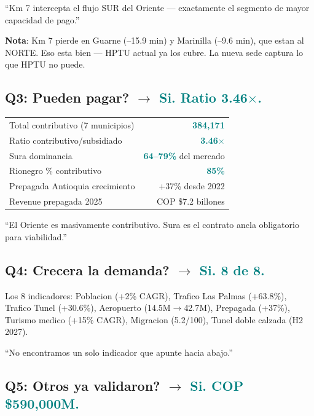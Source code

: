 \documentclass[11pt, a4paper]{article}
\newcommand{\hl}[1]{\textcolor{teal}{\textbf{#1}}}
\begin{document}
\begin{cita}
``Km 7 intercepta el flujo SUR del Oriente --- exactamente el segmento de mayor capacidad de pago.''
\end{cita}

\begin{tip}
\textbf{Nota}: Km 7 pierde en Guarne (--15.9 min) y Marinilla (--9.6 min), que estan al NORTE. Eso esta bien --- HPTU actual ya los cubre. La nueva sede captura lo que HPTU no puede.
\end{tip}

\subsection{Q3: Pueden pagar? $\to$ \hl{Si. Ratio 3.46$\times$.}}

\begin{tabular}{@{}l r@{}}
\toprule
Total contributivo (7 municipios) & \hl{384,171} \\
Ratio contributivo/subsidiado & \hl{3.46$\times$} \\
Sura dominancia & \hl{64--79\%} del mercado \\
Rionegro \% contributivo & \hl{85\%} \\
Prepagada Antioquia crecimiento & +37\% desde 2022 \\
Revenue prepagada 2025 & COP \$7.2 billones \\
\bottomrule
\end{tabular}

\begin{cita}
``El Oriente es masivamente contributivo. Sura es el contrato ancla obligatorio para viabilidad.''
\end{cita}

\subsection{Q4: Crecera la demanda? $\to$ \hl{Si. 8 de 8.}}

Los 8 indicadores: Poblacion (+2\% CAGR), Trafico Las Palmas (+63.8\%), Trafico Tunel (+30.6\%), Aeropuerto (14.5M$\to$42.7M), Prepagada (+37\%), Turismo medico (+15\% CAGR), Migracion (5.2/100), Tunel doble calzada (H2 2027).

\begin{cita}
``No encontramos un solo indicador que apunte hacia abajo.''
\end{cita}

\subsection{Q5: Otros ya validaron? $\to$ \hl{Si. COP \$590,000M.}}
\end{document}
